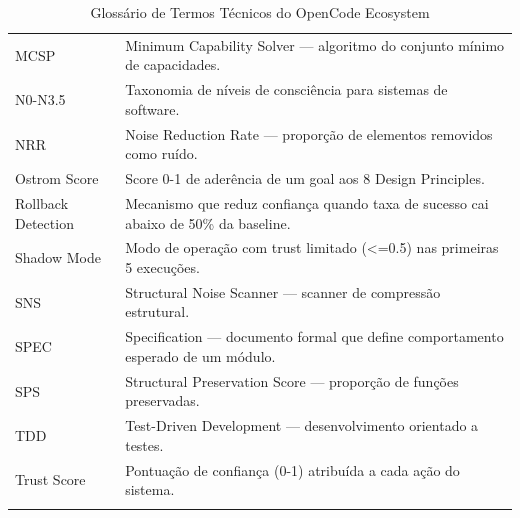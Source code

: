 \begin{apendicesenv}
\begin{longtable}{p{3.5cm}p{9.5cm}}
MCSP & Minimum Capability Solver — algoritmo do conjunto mínimo de capacidades. \\
N0-N3.5 & Taxonomia de níveis de consciência para sistemas de software. \\
NRR & Noise Reduction Rate — proporção de elementos removidos como ruído. \\
Ostrom Score & Score 0-1 de aderência de um goal aos 8 Design Principles. \\
Rollback Detection & Mecanismo que reduz confiança quando taxa de sucesso cai abaixo de 50\% da baseline. \\
Shadow Mode & Modo de operação com trust limitado (<=0.5) nas primeiras 5 execuções. \\
SNS & Structural Noise Scanner — scanner de compressão estrutural. \\
SPEC & Specification — documento formal que define comportamento esperado de um módulo. \\
SPS & Structural Preservation Score — proporção de funções preservadas. \\
TDD & Test-Driven Development — desenvolvimento orientado a testes. \\
Trust Score & Pontuação de confiança (0-1) atribuída a cada ação do sistema. \\
\bottomrule
\caption{Glossário de Termos Técnicos do OpenCode Ecosystem}
\end{longtable}

\end{apendicesenv}
